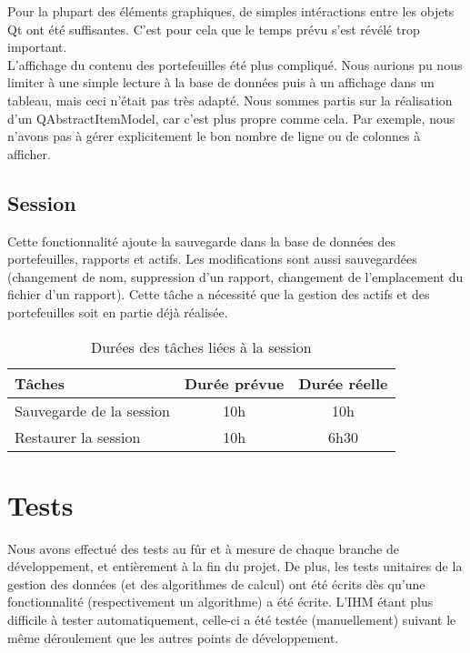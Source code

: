 \documentclass[a4paper]{report}
\begin{document}
Pour la plupart des éléments graphiques, de simples intéractions entre les objets Qt ont été suffisantes.
C'est pour cela que le temps prévu s'est révélé trop important.\\

L'affichage du contenu des portefeuilles été plus compliqué.
Nous aurions pu nous limiter à une simple lecture à la base de données puis à un affichage dans un tableau, mais ceci n'était pas très adapté.
Nous sommes partis sur la réalisation d'un QAbstractItemModel, car c'est plus propre comme cela.
Par exemple, nous n'avons pas à gérer explicitement le bon nombre de ligne ou de colonnes à afficher.

\section{Session}
Cette fonctionnalité ajoute la sauvegarde dans la base de données des portefeuilles, rapports et actifs.
Les modifications sont aussi sauvegardées (changement de nom, suppression d'un rapport, changement de l'emplacement du fichier d'un rapport).
Cette tâche a nécessité que la gestion des actifs et des portefeuilles soit en partie déjà réalisée.


\begin{table}[H]
\centering
  \begin{tabularx}{0.8\textwidth}{| X | c | c |}
    \hline
	Tâches & Durée prévue & Durée réelle \\
    \hline
    Sauvegarde de la session &  10h & 10h\\
    Restaurer la session &  10h & 6h30\\
    \hline
  \end{tabularx}
  \caption{Durées des tâches liées à la session}
\end{table}


\chapter{Tests}

Nous avons effectué des tests au fûr et à mesure de chaque branche de développement, et entièrement à la fin du projet.
De plus, les tests unitaires de la gestion des données (et des algorithmes de calcul) ont été écrits dès qu'une fonctionnalité (respectivement un algorithme) a été écrite.
L'IHM étant plus difficile à tester automatiquement, celle-ci a été testée (manuellement) suivant le même déroulement que les autres points de développement.
\end{document}

